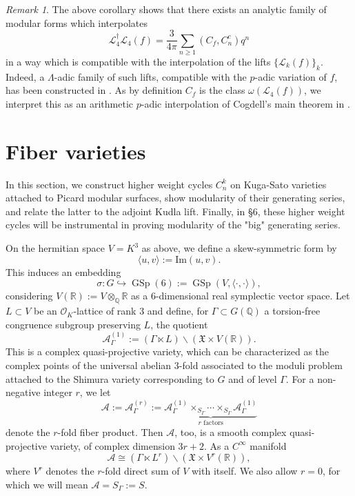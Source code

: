 \documentclass[12pt,a4paper,reqno]{amsart}
\theoremstyle{definition}
\numberwithin{definition}{subsection}
\theoremstyle{definition}
\numberwithin{Definition}{subsection}
\theoremstyle{remark}
\theoremstyle{remark}
\newtheorem{Remark}{Remark}
\numberwithin{Remark}{subsection}
\theoremstyle{remark}
\theoremstyle{plain}
\numberwithin{Theorem}{subsection}
\theoremstyle{plain}
\theoremstyle{plain}
\theoremstyle{plain}
\theoremstyle{plain}
\theoremstyle{plain}
\theoremstyle{plain}
\theoremstyle{plain}
\newcommand*{\Q}{\mathbb{Q}}
\newcommand*{\R}{\mathbb{R}}
\DeclareMathOperator{\GSp}{GSp}
\begin{document}
\begin{Remark}
The above corollary shows that there exists an analytic family of modular forms which interpolates 
\[
\mathcal{L}_4^\dagger \mathcal{L}_4(f)=\frac{3}{4\pi}\sum_{n\geq 1}(C_f,C_n^c)q^n
\]
in a way which is compatible with the interpolation of  the lifts $\{\mathcal{L}_k(f)\}_k$. Indeed, a $\Lambda$-adic family of such lifts, compatible with the $p$-adic variation of $f$, has been constructed in \cite{iudica}. As by definition $C_f$ is the class $\omega(\mathcal{L}_4(f))$, we interpret this as an arithmetic $p$-adic interpolation of Cogdell's main theorem in \cite{cogdell}.
\end{Remark}

\section{Fiber varieties}
In this section, we construct higher weight cycles $C_n^k$ on Kuga-Sato varieties attached to Picard modular surfaces, show modularity of their generating series, and relate the latter to the adjoint Kudla lift. Finally, in \S$6$, these higher weight cycles will be instrumental in proving modularity of the "big" generating series.

On the hermitian space $V=K^3$ as above, we define a skew-symmetric form by $$\langle u,v \rangle:=\text{Im}(u,v).$$ This induces an embedding $$\sigma:G\hookrightarrow \GSp(6):=\GSp(V, \langle\cdot,\cdot\rangle),$$ considering $V(\R):=V\otimes_\Q \R$ as a $6$-dimensional real symplectic vector space. Let $L\subset V$ be an $\mathcal{O}_K$-lattice of rank $3$ and define, for $\Gamma\subset G(\Q)$ a torsion-free congruence subgroup preserving $L$, the quotient
\[
\mathcal{A}_{\Gamma}^{(1)}:=(\Gamma\ltimes L)\backslash(\mathfrak{X}\times V(\R)).
\]
This is a complex quasi-projective variety, which can be characterized as the complex points of the universal abelian $3$-fold associated to the moduli problem attached to the Shimura variety corresponding to $G$ and of level $\Gamma$. For a non-negative integer $r$, we let
\[
\mathcal{A}:=\mathcal{A}_{\Gamma}^{(r)}:=\underbrace{\mathcal{A}_{\Gamma}^{(1)}\times_{S_{\Gamma}}\cdots\times_{S_{\Gamma}}\mathcal{A}_{\Gamma}^{(1)}}_\text{$r$ factors}
\]
denote the $r$-fold fiber product.
Then $\mathcal{A}$, too, is a smooth complex quasi-projective variety, of complex dimension $3r+2$. As a $C^\infty$ manifold
\[
\mathcal{A}\cong (\Gamma\ltimes L^r)\backslash(\mathfrak{X}\times V^r(\R)),
\] 
where $V^r$ denotes the $r$-fold direct sum of $V$ with itself. We also allow $r=0$, for which we will mean $\mathcal{A}=S_\Gamma:=S$. 
\end{document}
